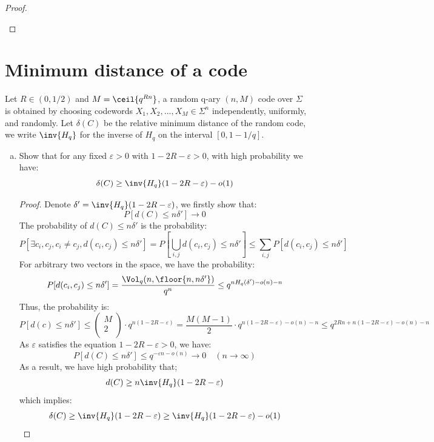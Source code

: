 \begin{proof}
\begin{enumerate}
\end{enumerate}

\end{proof}



\section{Minimum distance of a code}
Let \( R \in ( 0, 1/2 ) \) and \( M = \ceil{ q^{ Rn } } \), a random q-ary \( ( n, M ) \) code over \( \Sigma \) is obtained by choosing codewords \( X_1, X_2, ..., X_M \in \Sigma^n \) independently, uniformly, and randomly. Let \( \delta(C) \) be the relative minimum distance of the random code, we write \( \inv{ H_q } \) for the inverse of \( H_q \) on the interval \( [ 0, 1 - 1/q ] \).
\begin{enumerate}[(a)]
\item Show that for any fixed \( \varepsilon > 0 \) with \( 1 - 2 R - \varepsilon > 0 \), with high probability we have:
\[
    \delta(C) \ge \inv{ H_q } ( 1 - 2 R - \varepsilon ) - o (1)
\]
\begin{proof}
    Denote \( \delta' = \inv{ H_q }( 1 - 2R - \varepsilon ) \), we firstly show that: 
    \[
        P[ d(C) \le n \delta'] \to 0
    \]
    The probability of \( d(C) \le n\delta' \) is the probability:
    \[
        P [ \exists c_i, c_j, c_i \neq c_j, d( c_i, c_j ) \le n\delta' ]
        = P[ \bigcup_{ i, j } d( c_i, c_j ) \le n\delta' ]
        \le \sum_{ i, j } P[ d( c_i, c_j ) \le n\delta' ]
    \]
    For arbitrary two vectors in the space, we have the probability:
    \[
        P[ d( c_i, c_j ) \le n\delta' ]
        = \frac{ \Vol_q ( n, \floor{ n, n \delta' } ) }{ q^n }
        \le q^{ n H_q( \delta' ) - o(n) - n }
    \]
    Thus, the probability is:
    \[
        P[ d(c) \le n \delta' ] 
        \le \begin{pmatrix}
            M \\ 
            2 \\
        \end{pmatrix} \cdot 
        q^{ n( 1 - 2R - \varepsilon ) }
        = \frac{ M ( M - 1 ) }{ 2 }
        \cdot q^{ n ( 1 - 2R - \varepsilon ) - o(n) - n }
        \le q^{ 2Rn + n( 1 - 2R - \varepsilon ) - o(n) - n}
    \]
    As \( \varepsilon \) satisfies the equation \( 1 - 2R - \varepsilon > 0 \), we have:
    \[
        P[ d( C ) \le n \delta' ] 
        \le q^{ -\varepsilon n - o(n) } \to 0 
        \quad 
        ( n \to \infty )
    \]
    As a result, we have high probability that;
    \[
        d(C) \ge n\inv{ H_q }( 1 - 2R - \varepsilon )
    \]
    which implies:
    \[
        \delta(C) 
        \ge \inv{H_q}( 1 - 2 R - \varepsilon )
        \ge \inv{H_q}( 1 - 2 R - \varepsilon )
        - o(1)
    \]
\end{proof}



\end{enumerate}
